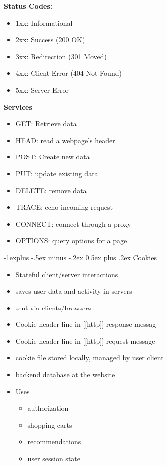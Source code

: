 \documentclass[letterpaper, 8pt]{extarticle}
\makeatletter
\renewcommand{\subsection}{\@startsection{subsection}{2}{0mm}%
                                {-1explus -.5ex minus -.2ex}%
                                {0.5ex plus .2ex}%
                                {\normalfont\small\bfseries}}
\makeatother
\begin{document}
\begin{multicols*}{4}
	\textbf{Status Codes:}
	\begin{itemize}
		\item 1xx: Informational
		\item 2xx: Success (200 OK)
		\item 3xx: Redirection (301 Moved)
		\item 4xx: Client Error (404 Not Found)
		\item 5xx: Server Error
	\end{itemize}

	\textbf{Services}
	\begin{itemize}
		\item GET: Retrieve data
		\item HEAD: read a webpage's header
		\item POST: Create new data
		\item PUT: update existing data
		\item DELETE: remove data
		\item TRACE: echo incoming request
		\item CONNECT: connect through a proxy
		\item OPTIONS: query options for a page
	\end{itemize}

	\subsection{Cookies}
	\begin{itemize}
		\item Stateful client/server interactions
		\item saves user data and activity in servers
		\item sent via clients/browsers
		\item Cookie header line in [[http]] response messag
		\item Cookie header line in [[http]] request message
		\item cookie file stored locally, managed by user client
		\item backend database at the website
		\item Uses
		      \begin{itemize}
			      \item authorization
			      \item shopping carts
			      \item recommendations
			      \item user session state
		      \end{itemize}
	\end{itemize}


\end{multicols*}
\end{document}
